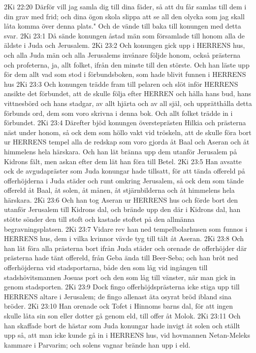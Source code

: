 2Ki 22:20  Därför vill jag samla dig till dina fäder, så att du får samlas till dem i din grav med frid; och dina ögon skola slippa att se all den olycka som jag skall låta komma över denna plats." Och de vände till baka till konungen med detta svar.
2Ki 23:1  Då sände konungen åstad män som församlade till honom alla de äldste i Juda och Jerusalem.
2Ki 23:2  Och konungen gick upp i HERRENS hus, och alla Juda män och alla Jerusalems invånare följde honom, också prästerna och profeterna, ja, allt folket, ifrån den minste till den störste. Och han läste upp för dem allt vad som stod i förbundsboken, som hade blivit funnen i HERRENS hus
2Ki 23:3  Och konungen trädde fram till pelaren och slöt inför HERRENS ansikte det förbundet, att de skulle följa efter HERREN och hålla hans bud, hans vittnesbörd och hans stadgar, av allt hjärta och av all själ, och upprätthålla detta förbunds ord, dem som voro skrivna i denna bok. Och allt folket trädde in i förbundet.
2Ki 23:4  Därefter bjöd konungen översteprästen Hilkia och prästerna näst under honom, så ock dem som höllo vakt vid tröskeln, att de skulle föra bort ur HERRENS tempel alla de redskap som voro gjorda åt Baal och Aseran och åt himmelens hela härskara. Och han lät bränna upp dem utanför Jerusalem på Kidrons fält, men askan efter dem lät han föra till Betel.
2Ki 23:5  Han avsatte ock de avgudapräster som Juda konungar hade tillsatt, för att tända offereld på offerhöjderna i Juda städer och runt omkring Jerusalem, så ock dem som tände offereld åt Baal, åt solen, åt månen, åt stjärnbilderna och åt himmelens hela härskara.
2Ki 23:6  Och han tog Aseran ur HERRENS hus och förde bort den utanför Jerusalem till Kidrons dal, och brände upp den där i Kidrons dal, han stötte sönder den till stoft och kastade stoftet på den allmänna begravningsplatsen.
2Ki 23:7  Vidare rev han ned tempelbolarhusen som funnos i HERRENS hus, dem i vilka kvinnor vävde tyg till tält åt Aseran.
2Ki 23:8  Och han lät föra alla prästerna bort ifrån Juda städer och orenade de offerhöjder där prästerna hade tänt offereld, från Geba ända till Beer-Seba; och han bröt ned offerhöjderna vid stadsportarna, både den som låg vid ingången till stadshövitsmannen Josuas port och den som låg till vänster, när man gick in genom stadsporten.
2Ki 23:9  Dock fingo offerhöjdsprästerna icke stiga upp till HERRENS altare i Jerusalem; de fingo allenast äta osyrat bröd ibland sina bröder.
2Ki 23:10  Han orenade ock Tofet i Hinnoms barns dal, för att ingen skulle låta sin son eller dotter gå genom eld, till offer åt Molok.
2Ki 23:11  Och han skaffade bort de hästar som Juda konungar hade invigt åt solen och ställt upp så, att man icke kunde gå in i HERRENS hus, vid hovmannen Netan-Meleks kammare i Parvarim; och solens vagnar brände han upp i eld.
